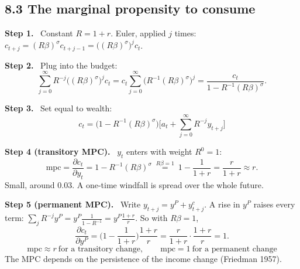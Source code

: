 \documentclass[12pt]{article}
\newcommand{\st}[1]{\par\smallskip\textbf{Step #1.}\ }
\newcommand{\ans}[1]{\[\boxed{\ #1\ }\]}
\begin{document}
\subsection*{8.3 The marginal propensity to consume}
\st{1} Constant $R=1+r$. Euler, applied $j$ times: $c_{t+j}=(R\beta)^\sigma c_{t+j-1}=\big((R\beta)^\sigma\big)^jc_t$.
\st{2} Plug into the budget:
\[
\sum_{j=0}^\infty R^{-j}\big((R\beta)^\sigma\big)^jc_t=c_t\sum_{j=0}^\infty\big(R^{-1}(R\beta)^\sigma\big)^j=\frac{c_t}{1-R^{-1}(R\beta)^\sigma}.
\]
\st{3} Set equal to wealth:
\ans{c_t=\big(1-R^{-1}(R\beta)^\sigma\big)\Big[a_t+\sum_{j=0}^\infty R^{-j}y_{t+j}\Big]}
\st{4 (transitory MPC)} $y_t$ enters with weight $R^0=1$:
\[
\text{mpc}=\frac{\partial c_t}{\partial y_t}=1-R^{-1}(R\beta)^\sigma\ \overset{R\beta=1}{=}\ 1-\frac{1}{1+r}=\frac{r}{1+r}\approx r .
\]
Small, around 0.03. A one-time windfall is spread over the whole future.
\st{5 (permanent MPC)} Write $y_{t+j}=y^P+y^c_{t+j}$. A rise in $y^P$ raises every term:
$\sum_jR^{-j}y^P=y^P\frac{1}{1-R^{-1}}=y^P\frac{1+r}{r}$. So with $R\beta=1$,
\[
\frac{\partial c_t}{\partial y^P}=\Big(1-\frac{1}{1+r}\Big)\frac{1+r}{r}=\frac{r}{1+r}\cdot\frac{1+r}{r}=1 .
\]
\ans{\text{mpc}\approx r\ \text{for a transitory change},\qquad\text{mpc}=1\ \text{for a permanent change}}
The MPC depends on the persistence of the income change (Friedman 1957).
\end{document}
